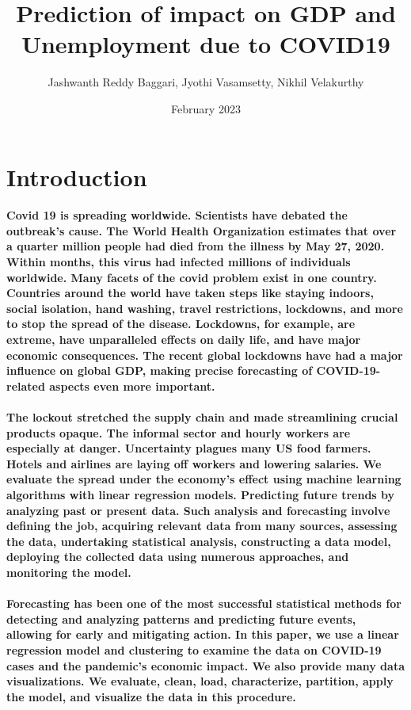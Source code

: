 \documentclass{article}
\title{Prediction of impact on GDP and Unemployment due to COVID19}
\author{Jashwanth Reddy Baggari,
        Jyothi Vasamsetty,
        Nikhil Velakurthy}
\date{February 2023}
\begin{document}
\maketitle

\section{Introduction}
    
\paragraph{Covid 19 is spreading worldwide. Scientists have debated the outbreak’s cause.
The World Health Organization estimates that over a quarter million people had died from the illness 
by May 27, 2020. Within months, this virus had infected millions of individuals worldwide. Many facets 
of the covid problem exist in one country. Countries around the world have taken steps like staying 
indoors, social isolation, hand washing, travel restrictions, lockdowns, and more to stop the spread 
of the disease. Lockdowns, for example, are extreme, have unparalleled effects on daily life, and have 
major economic consequences. The recent global lockdowns have had a major influence on global GDP, 
making precise forecasting of COVID-19-related aspects even more important.} 
    
\paragraph{The lockout stretched the supply chain and made streamlining crucial products opaque. The informal 
sector and hourly workers are especially at danger. Uncertainty plagues many US food farmers. Hotels 
and airlines are laying off workers and lowering salaries. We evaluate the spread under the economy’s 
effect using machine learning algorithms with linear regression models. Predicting future trends by 
analyzing past or present data. Such analysis and forecasting involve defining the job, acquiring 
relevant data from many sources, assessing the data, undertaking statistical analysis, constructing a 
data model, deploying the collected data using numerous approaches, and monitoring the model.}

\paragraph{Forecasting has been one of the most successful statistical methods for detecting and 
analyzing patterns and predicting future events, allowing for early and mitigating action. In this paper, we use 
a linear regression model and clustering to examine the data on COVID-19 cases and the pandemic’s 
economic impact. We also provide many data visualizations. We evaluate, clean, load, characterize, 
partition, apply the model, and visualize the data in this procedure.}
\end{document}
